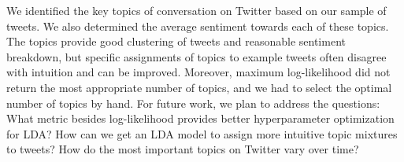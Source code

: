 \documentclass{sig-alternate-05-2015}
\begin{document}
We identified the key topics of conversation on Twitter based on our sample of tweets. We also determined the average sentiment towards each of these topics.
%
The topics provide good clustering of tweets and reasonable sentiment breakdown, but specific assignments of topics to example tweets often disagree with intuition and can be improved.
%
Moreover, maximum log-likelihood did not return the most appropriate number of topics, and we had to select the optimal number of topics by hand.
%
For future work, we plan to address the questions: What metric besides log-likelihood provides better hyperparameter optimization for LDA? How can we get an LDA model to assign more intuitive topic mixtures to tweets? How do the most important topics on Twitter vary over time?




\end{document}
